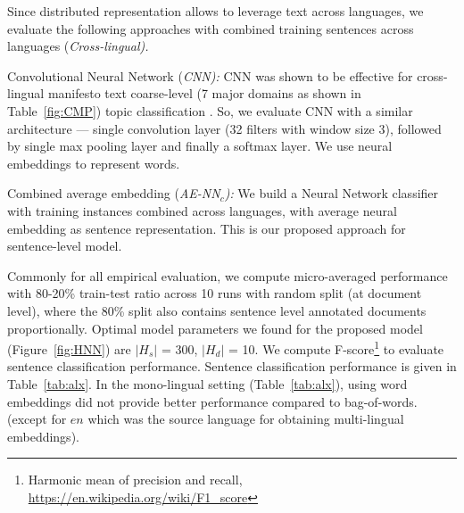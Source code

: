\documentclass[11pt,a4paper]{article}
\newcommand{\tabref}[2][]{Table#1~\ref{#2}\xspace}
\newcommand{\figref}[2][]{Figure#1~\ref{#2}\xspace}
\newcommand{\norm}[1]{\vert #1 \vert}
\begin{document}
Since distributed representation allows to leverage text across languages, we evaluate the following approaches with combined training sentences across languages (\em{Cross-lingual}). \rm

\begin{description}
\item{Convolutional Neural Network (\em{CNN}):} CNN was shown to be effective for cross-lingual manifesto text coarse-level (7 major domains as shown in \tabref{fig:CMP}) topic classification \cite{W17-2906}. So, we evaluate CNN with a similar architecture --- single convolution layer (32 filters with window size 3), followed by single max pooling layer and finally a softmax layer. We use neural embeddings to represent words.
\item{Combined average embedding (\em{AE-NN$_{c}$}):} We build a Neural Network classifier with training instances combined across languages, with average neural embedding as sentence representation. This is our proposed approach for sentence-level model.
\end{description}

Commonly for all empirical evaluation, we compute micro-averaged performance with 80-20\% train-test ratio across 10 runs with random split (at document level), where the 80\% split also contains sentence level annotated documents proportionally. Optimal model parameters we found for the proposed model (\figref{fig:HNN}) are $\norm{H_{s}}$ = 300, $\norm{H_{d}}$ = 10. We compute F-score\footnote{Harmonic mean of precision and recall, \url{https://en.wikipedia.org/wiki/F1_score}} to evaluate sentence classification performance. Sentence classification performance is given in \tabref{tab:alx}. In the mono-lingual setting (\tabref{tab:alx}), using word embeddings did not provide better performance compared to bag-of-words. (except for $en$ which was the source language for obtaining multi-lingual embeddings). 
\end{document}
